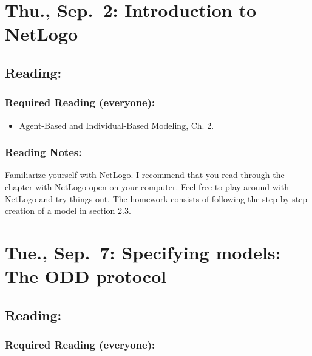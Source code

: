 \documentclass[
]{article}
\providecommand{\tightlist}{%
  \setlength{\itemsep}{0pt}\setlength{\parskip}{0pt}}
\begin{document}
\hypertarget{thu.-sep.-2-introduction-to-netlogo}{%
\section{Thu., Sep.~2: Introduction to
NetLogo}\label{thu.-sep.-2-introduction-to-netlogo}}

\hypertarget{reading-2}{%
\subsection{Reading:}\label{reading-2}}

\hypertarget{required-reading-everyone-1}{%
\subsubsection{Required Reading
(everyone):}\label{required-reading-everyone-1}}

\begin{itemize}
\tightlist
\item
  Agent-Based and Individual-Based Modeling, Ch. 2.
\end{itemize}

\hypertarget{reading-notes-1}{%
\subsubsection{Reading Notes:}\label{reading-notes-1}}

Familiarize yourself with NetLogo. I recommend that you read through the
chapter with NetLogo open on your computer. Feel free to play around
with NetLogo and try things out. The homework consists of following the
step-by-step creation of a model in section 2.3.

\hypertarget{tue.-sep.-7-specifying-models-the-odd-protocol}{%
\section{Tue., Sep.~7: Specifying models: The ODD
protocol}\label{tue.-sep.-7-specifying-models-the-odd-protocol}}

\hypertarget{reading-3}{%
\subsection{Reading:}\label{reading-3}}

\hypertarget{required-reading-everyone-2}{%
\subsubsection{Required Reading
(everyone):}\label{required-reading-everyone-2}}
\end{document}
